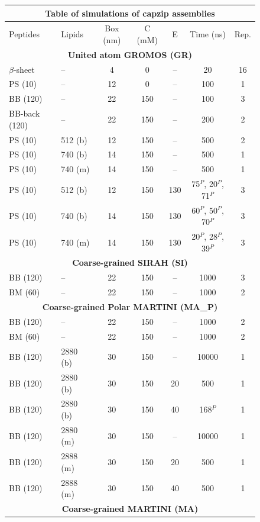 \begin{figure}[p!]
\centering
\scriptsize
 \def\arraystretch{1.6}
\begin{tabular}{llccccc}
\multicolumn{7}{c}{\small\textbf{Table of simulations of capzip assemblies}} \\
 \hline
Peptides & Lipids & Box (nm) & C (mM) & E & Time (ns) & Rep. \\
 \hline
\multicolumn{7}{c}{\textbf{United atom GROMOS (GR)}} \\
 $\beta$-sheet & -- & 4 & 0 & -- & 20 & 16 \\
 PS (10) & -- & 12 & 0 & -- & 100 & 1 \\
 BB (120) & -- & 22 & 150 & -- & 100 & 3 \\
 BB-back (120) & -- & 22 & 150 & -- & 200 & 2 \\
 PS (10) & 512 (b) & 12 & 150 & -- & 500 & 2 \\
 PS (10) & 740 (b) & 14 & 150 & -- & 500 & 1 \\
 PS (10) & 740 (m) & 14 & 150 & -- & 500 & 1 \\
 PS (10) & 512 (b) & 12 & 150 & 130 & 75$^P$, 20$^P$, 71$^P$ & 3 \\
 PS (10) & 740 (b) & 14 & 150 & 130 & 60$^P$, 50$^P$, 70$^P$ & 3 \\
 PS (10) & 740 (m) & 14 & 150 & 130 & 20$^P$, 28$^P$, 39$^P$ & 3 \\
 \hline
\multicolumn{7}{c}{\textbf{Coarse-grained SIRAH (SI)}} \\
 BB (120) & -- & 22 & 150 & -- & 1000 & 3 \\
 BM (60) & -- & 22 & 150 & -- & 1000 & 2 \\
 \hline
\multicolumn{7}{c}{\textbf{Coarse-grained Polar MARTINI (MA\_P)}} \\
 BB (120) & -- & 22 & 150 & -- & 1000 & 2 \\
 BM (60) & -- & 22 & 150 & -- & 1000 & 2 \\
 BB (120) & 2880 (b) & 30 & 150 & -- & 10000 & 1 \\
 BB (120) & 2880 (b) & 30 & 150 & 20 & 500 & 1 \\
 BB (120) & 2880 (b) & 30 & 150 & 40 & 168$^P$ & 1 \\
 BB (120) & 2880 (m) & 30 & 150 & -- & 10000 & 1 \\
 BB (120) & 2888 (m) & 30 & 150 & 20 & 500 & 1 \\
 BB (120) & 2888 (m) & 30 & 150 & 40 & 500 & 1 \\
 \hline
\multicolumn{7}{c}{\textbf{Coarse-grained MARTINI (MA)}} \\

\end{tabular}
\end{figure}
